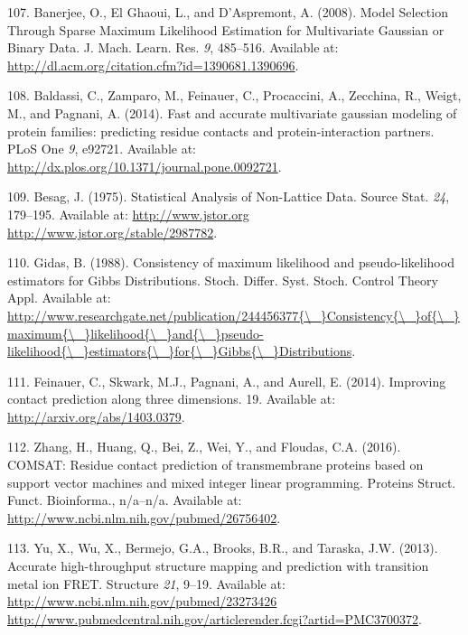 \documentclass[11pt,a4paper,twoside]{book}
\theoremstyle{definition}
\theoremstyle{definition}
\theoremstyle{remark}
\begin{document}
\hypertarget{ref-Banerjee2008}{}
107. Banerjee, O., El Ghaoui, L., and D'Aspremont, A. (2008). Model
Selection Through Sparse Maximum Likelihood Estimation for Multivariate
Gaussian or Binary Data. J. Mach. Learn. Res. \emph{9}, 485--516.
Available at: \url{http://dl.acm.org/citation.cfm?id=1390681.1390696}.

\hypertarget{ref-Baldassi2014}{}
108. Baldassi, C., Zamparo, M., Feinauer, C., Procaccini, A., Zecchina,
R., Weigt, M., and Pagnani, A. (2014). Fast and accurate multivariate
gaussian modeling of protein families: predicting residue contacts and
protein-interaction partners. PLoS One \emph{9}, e92721. Available at:
\url{http://dx.plos.org/10.1371/journal.pone.0092721}.

\hypertarget{ref-Besag1975}{}
109. Besag, J. (1975). Statistical Analysis of Non-Lattice Data. Source
Stat. \emph{24}, 179--195. Available at:
\href{http://www.jstor.org\%20http://www.jstor.org/stable/2987782}{http://www.jstor.org http://www.jstor.org/stable/2987782}.

\hypertarget{ref-Gidas1988}{}
110. Gidas, B. (1988). Consistency of maximum likelihood and
pseudo-likelihood estimators for Gibbs Distributions. Stoch. Differ.
Syst. Stoch. Control Theory Appl. Available at:
\href{http://www.researchgate.net/publication/244456377\%7B/_\%7DConsistency\%7B/_\%7Dof\%7B/_\%7Dmaximum\%7B/_\%7Dlikelihood\%7B/_\%7Dand\%7B/_\%7Dpseudo-likelihood\%7B/_\%7Destimators\%7B/_\%7Dfor\%7B/_\%7DGibbs\%7B/_\%7DDistributions}{http://www.researchgate.net/publication/244456377\{\textbackslash{}\_\}Consistency\{\textbackslash{}\_\}of\{\textbackslash{}\_\}maximum\{\textbackslash{}\_\}likelihood\{\textbackslash{}\_\}and\{\textbackslash{}\_\}pseudo-likelihood\{\textbackslash{}\_\}estimators\{\textbackslash{}\_\}for\{\textbackslash{}\_\}Gibbs\{\textbackslash{}\_\}Distributions}.

\hypertarget{ref-Feinauer2014}{}
111. Feinauer, C., Skwark, M.J., Pagnani, A., and Aurell, E. (2014).
Improving contact prediction along three dimensions. 19. Available at:
\url{http://arxiv.org/abs/1403.0379}.

\hypertarget{ref-Zhang2016}{}
112. Zhang, H., Huang, Q., Bei, Z., Wei, Y., and Floudas, C.A. (2016).
COMSAT: Residue contact prediction of transmembrane proteins based on
support vector machines and mixed integer linear programming. Proteins
Struct. Funct. Bioinforma., n/a--n/a. Available at:
\url{http://www.ncbi.nlm.nih.gov/pubmed/26756402}.

\hypertarget{ref-Yu2013}{}
113. Yu, X., Wu, X., Bermejo, G.A., Brooks, B.R., and Taraska, J.W.
(2013). Accurate high-throughput structure mapping and prediction with
transition metal ion FRET. Structure \emph{21}, 9--19. Available at:
\href{http://www.ncbi.nlm.nih.gov/pubmed/23273426\%20http://www.pubmedcentral.nih.gov/articlerender.fcgi?artid=PMC3700372}{http://www.ncbi.nlm.nih.gov/pubmed/23273426 http://www.pubmedcentral.nih.gov/articlerender.fcgi?artid=PMC3700372}.
\end{document}
